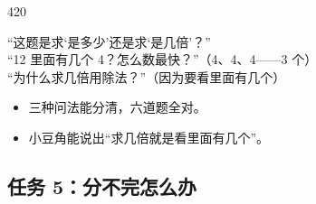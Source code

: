 \begin{lesson}{4}{20}
\begin{saybox}
“这题是求‘是多少’还是求‘是几倍’？”\\
“12 里面有几个 4？怎么数最快？”（4、4、4——3 个）\\
“为什么求几倍用除法？”（因为要看里面有几个）
\end{saybox}

\begin{passbox}
\begin{itemize}
  \item 三种问法能分清，六道题全对。
  \item 小豆角能说出“求几倍就是看里面有几个”。
\end{itemize}
\end{passbox}
\end{lesson}

\subsection{任务 5：分不完怎么办}

